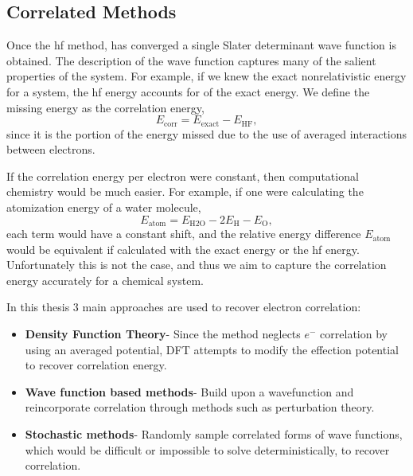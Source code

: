 \subsection{Correlated Methods}
Once the \gls{hf} method, has converged a single Slater determinant wave function is obtained.
The description of the wave function captures many of the salient properties of the system.
For example, if we knew the exact nonrelativistic energy for a system, the \gls{hf} energy accounts for  of the exact energy.
We define the missing energy as the correlation energy,
\begin{equation}
E_{\mathrm{corr}} = E_{\mathrm{exact}} - E_{\mathrm{HF}},
\end{equation}
since it is the portion of the energy missed due to the use of averaged interactions between electrons.

If the correlation energy per electron were constant, then computational chemistry would be much easier.
For example, if one were calculating the atomization energy of a water molecule,
\begin{equation}
    E_{\mathrm{atom}} = E_{\mathrm{H2O}} - 2 E_{\mathrm{H}} - E_{\mathrm{O}},
\end{equation}
each term would have a constant shift, and the relative energy difference $E_{\mathrm{atom}}$ would be equivalent if calculated with the exact energy or the \gls{hf} energy.
Unfortunately this is not the case, and thus we aim to capture the correlation energy accurately for a chemical system.

In this thesis 3 main approaches are used to recover electron correlation:
\begin{itemize}
    \item \textbf{Density Function Theory}- Since the  method neglects $e^{-}$ correlation by using an averaged potential, DFT attempts to modify the effection potential to recover correlation energy.
    \item \textbf{Wave function based methods}- Build upon a  wavefunction and reincorporate correlation through methods such as perturbation theory.
\item \textbf{Stochastic methods}- Randomly sample correlated forms of wave functions, which would be difficult or impossible to solve deterministically, to recover correlation.
\end{itemize}
